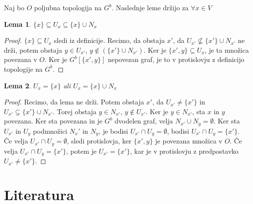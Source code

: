 \documentclass[mat1, tisk]{fmfdelo}
\newtheorem{lemma}{Lema}[subsection]
\begin{document}
Naj bo $O$ poljubna topologija na $G^b$. Naslednje leme držijo za $\forall x \in V$
\begin{lemma}
  $\{x\} \subseteq U_x \subseteq \{x\} \cup N_x$
\end{lemma}
\begin{proof}
  $\{x\} \subseteq U_x$ sledi iz definicije. Recimo, da obstaja $x'$, da
  $U_{x'} \nsubseteq \{x'\} \cup N_{x'}$ ne drži, potem obstaja
  $y \in U_{x'}$, $y \notin (\{x'\} \cup N_{x'})$. Ker je $\{x', y\} \subseteq U_x$,
  je ta množica povezana v $O$. Ker je $G^b[\{x',y\}]$ nepovezan graf, je to v
  protislovju z definicijo topologije na $G^b$.
\end{proof}
\begin{lemma}
  $U_x = \{x\}$ ali $U_x = \{x\} \cup N_x$
\end{lemma}
\begin{proof}
  Recimo, da lema ne drži. Potem obstaja $x'$, da $U_{x'} \neq \{x'\}$ in
  $U_{x'} \subsetneq \{x'\} \cup N_{x'}$. Torej obstaja $y \in N_{x'}$, $y \notin U_{x'}$.
  Ker je $y \in N_{x'}$, sta $x$ in $y$ povezana. Ker sta povezana in je $G^b$
  dvodelen graf, velja $N_{x'} \cup N_y = \emptyset$. Ker sta $U_{x'}$ in $U_y$ 
  podmnožici $N_x'$ in $N_y$, je bodisi $U_{x'} \cap U_y = \emptyset$,
  bodisi $U_{x'} \cap U_y = \{x'\}$. Če velja $U_{x'} \cap U_y = \emptyset$, sledi
  protislovja, ker $\{x',y\}$ je povezana množica v $O$.
  Če velja $U_{x'} \cap U_y = \{x'\}$, potem je $U_{x'} = \{x'\}$, kar je v
  protislovju z predpostavko $U_{x'} \neq \{x'\}$.
\end{proof}

\cleardoublepage
\section{Literatura}
\nocite{*}

\newpage
\end{document}
